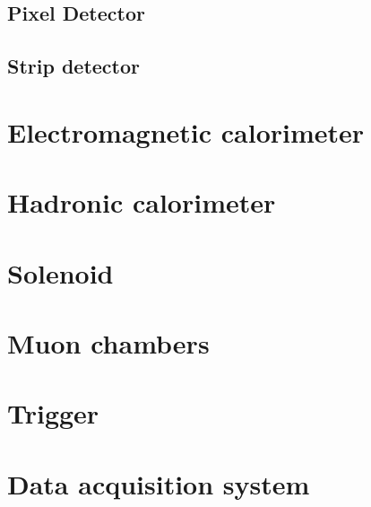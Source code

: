 \subsection{Pixel Detector}



\subsection{Strip detector}


\section{Electromagnetic calorimeter}




\section{Hadronic calorimeter}



\section{Solenoid}



\section{Muon chambers}


\section{Trigger}


\section{Data acquisition system}